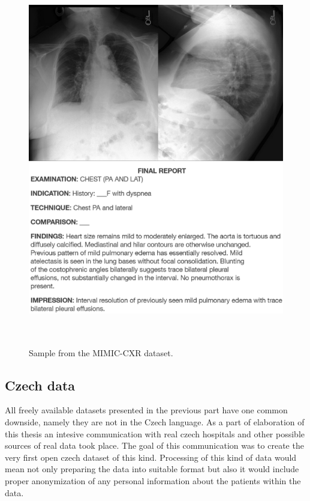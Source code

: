 \begin{figure}[h]\centering
\includegraphics[width=135mm, height=163mm]{../img/mimic_s57861150}
\caption{Sample from the MIMIC-CXR dataset.}
\label{fig02:MimicCXRSample}
\end{figure}

\newpage

\subsection{Czech data}
All freely available datasets presented in the previous part have one common downside, namely they are not in the Czech language. As a part of elaboration of this thesis an intesive communication with real czech hospitals and other possible sources of real data took place. The goal of this communication was to create the very first open czech dataset of this kind. Processing of this kind of data would mean not only preparing the data into suitable format but also it would include proper anonymization of any personal information about the patients within the data. \\


